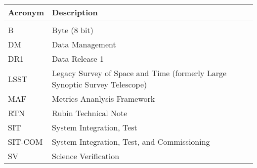 \addtocounter{table}{-1}
\begin{longtable}{p{}p{}}\hline
\textbf{Acronym} & \textbf{Description}  \\\hline

 &  \\\hline
B & Byte (8 bit) \\\hline
DM & Data Management \\\hline
DR1 & Data Release 1 \\\hline
LSST & Legacy Survey of Space and Time (formerly Large Synoptic Survey Telescope) \\\hline
MAF & Metrics Ananlysis Framework \\\hline
RTN & Rubin Technical Note \\\hline
SIT & System Integration, Test \\\hline
SIT-COM & System Integration, Test, and Commissioning \\\hline
SV & Science Verification \\\hline
\end{longtable}
